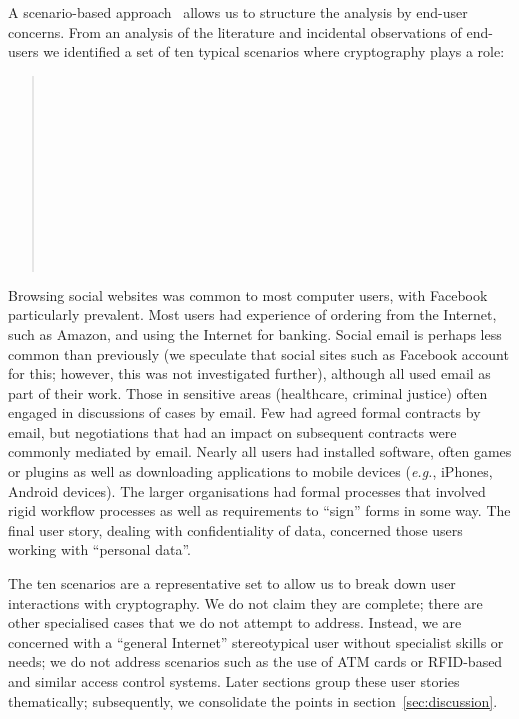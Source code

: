 \documentclass{article}
\def\cite{\citep}
\newcommand{\eg}{\textit{e.g.}}
\begin{document}
A scenario-based approach~\cite{Carroll+98,Rosson+02} allows us to
structure the analysis by end-user concerns. From an analysis of the
literature and incidental observations of end-users we identified a
set of ten typical scenarios where cryptography plays a role:
\begin{quote}
  \begin{tabbing}
    \USwsocial \\
    \USwecommerce\\
    \USwbanking\\
    \USesocial\\
    \USesensitive\\
    \USecontract\\
    \USsupdate\\
    \USfinternal\\
    \USfsign\\
    \USdata\\
  \end{tabbing}
\end{quote}
Browsing social websites was common to most computer users, with
Facebook particularly prevalent.  Most users had experience of
ordering from the Internet, such as Amazon, and using the Internet for
banking.  Social email is perhaps less common than previously (we
speculate that social sites such as Facebook account for this;
however, this was not investigated further), although all used email
as part of their work.  Those in sensitive areas (healthcare, criminal
justice) often engaged in discussions of cases by email.  Few had
agreed formal contracts by email, but negotiations that had an impact
on subsequent contracts were commonly mediated by email.  Nearly all
users had installed software, often games or plugins as well as
downloading applications to mobile devices (\eg, iPhones, Android
devices).  The larger organisations had formal processes that involved
rigid workflow processes as well as requirements to ``sign'' forms
in some way.  The final user story, dealing with confidentiality of
data, concerned those users working with “personal data”.

The ten scenarios are a representative set to allow
us to break down user interactions with cryptography.  We do not claim
they are complete; there are other specialised cases that we do not
attempt to address.  Instead, we are concerned with a ``general
Internet'' stereotypical user without specialist skills or needs; 
we do not address scenarios such as the use of ATM cards or RFID-based and similar access control systems.
Later sections group these user stories thematically;
subsequently, we consolidate the points in
section~\ref{sec:discussion}.  
\end{document}
